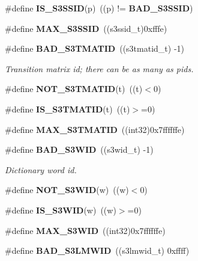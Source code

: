 \begin{DoxyCompactItemize}
\item 
\#define {\bfseries I\-S\-\_\-\-S3\-S\-S\-I\-D}(p)~((p) != {\bf B\-A\-D\-\_\-\-S3\-S\-S\-I\-D})\label{s3types_8h_ac533a32014a94120efdce25e72250d29}

\item 
\#define {\bfseries M\-A\-X\-\_\-\-S3\-S\-S\-I\-D}~((s3ssid\-\_\-t)0xfffe)\label{s3types_8h_a2117753e26a16eb54e65bf9eb1e7da71}

\item 
\#define {\bf B\-A\-D\-\_\-\-S3\-T\-M\-A\-T\-I\-D}~((s3tmatid\-\_\-t) -\/1)\label{s3types_8h_a0ffaad3d41b251f6fa9b3bf100c65e43}

\begin{DoxyCompactList}\small\item\em Transition matrix id; there can be as many as pids. \end{DoxyCompactList}\item 
\#define {\bfseries N\-O\-T\-\_\-\-S3\-T\-M\-A\-T\-I\-D}(t)~((t)$<$0)\label{s3types_8h_ab264bfd7015d51a198493bfdb865f048}

\item 
\#define {\bfseries I\-S\-\_\-\-S3\-T\-M\-A\-T\-I\-D}(t)~((t)$>$=0)\label{s3types_8h_a20077ac868a70e926afc38da292cc2dd}

\item 
\#define {\bfseries M\-A\-X\-\_\-\-S3\-T\-M\-A\-T\-I\-D}~((int32)0x7ffffffe)\label{s3types_8h_ad2cb6136cfcdf796b0d9898dca87d78b}

\item 
\#define {\bf B\-A\-D\-\_\-\-S3\-W\-I\-D}~((s3wid\-\_\-t) -\/1)\label{s3types_8h_a5c42410b7125da611210c5a4be29898b}

\begin{DoxyCompactList}\small\item\em Dictionary word id. \end{DoxyCompactList}\item 
\#define {\bfseries N\-O\-T\-\_\-\-S3\-W\-I\-D}(w)~((w)$<$0)\label{s3types_8h_a7b364438f577cb6720a626f4e5f9f8a9}

\item 
\#define {\bfseries I\-S\-\_\-\-S3\-W\-I\-D}(w)~((w)$>$=0)\label{s3types_8h_a07f5b75772f56f3de78e139e69c2daf9}

\item 
\#define {\bfseries M\-A\-X\-\_\-\-S3\-W\-I\-D}~((int32)0x7ffffffe)\label{s3types_8h_a7ceb7a1c017e804d3ffdb49085fb8e3f}

\item 
\#define {\bf B\-A\-D\-\_\-\-S3\-L\-M\-W\-I\-D}~((s3lmwid\-\_\-t) 0xffff)\label{s3types_8h_a8b6ebbb3ea347c20d1bbc991086ce875}


\end{DoxyCompactItemize}

